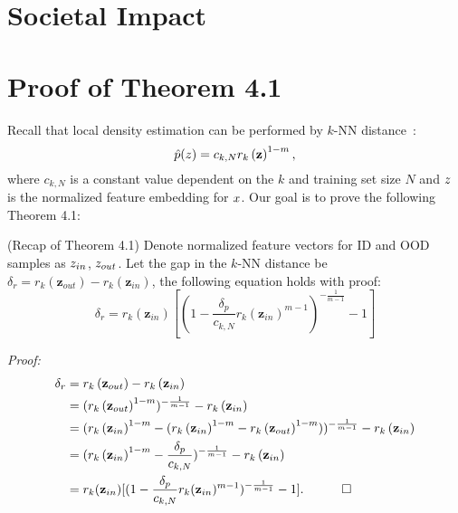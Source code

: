 
\appendix

\section{Societal Impact}

\section{Proof of Theorem 4.1}
\label{sec:proof_sup}
Recall that  local density estimation can be performed by $k$-NN distance~\cite{sun2022knn}: 
\begin{equation*}
\label{eq:estimate}
    \hat{p}(\*z) = c_{k, N} r_k\left(\mathbf{z}\right)^{1-m},
\end{equation*} where $c_{k, N}$ is a constant value dependent on the $k$ and training set size $N$ and $\*z$ is the normalized feature embedding for $\*x$. Our goal is to prove the following Theorem 4.1:

\begin{theorem} (Recap of Theorem 4.1) 
    Denote normalized feature vectors for ID and OOD samples as $\*z_{in}$, $\*z_{out}$. 
     Let the gap in the $k$-NN distance be $\delta_r = r_k\left(\mathbf{z}_{out}\right) -r_k\left(\mathbf{z}_{in}\right)$, the following equation holds with proof: 
     \begin{equation*}
         \delta_r = r_k(\mathbf{z}_{in}) [(1 - \frac{\delta_p}{c_{k, N}} r_k(\mathbf{z}_{in})^{m-1})^{-\frac{1}{m-1}} - 1]
     \end{equation*}
\end{theorem}

\textit{Proof:}
\begin{align*}
\small
\delta_r &= r_k\left(\mathbf{z}_{out}\right) -r_k\left(\mathbf{z}_{in}\right) \\
&= (r_k\left(\mathbf{z}_{out}\right)^{1-m})^{-\frac{1}{m-1}} -r_k\left(\mathbf{z}_{in}\right) \\
    &= (r_k\left(\mathbf{z}_{in}\right)^{1-m} - (r_k\left(\mathbf{z}_{in}\right)^{1-m} - r_k\left(\mathbf{z}_{out}\right)^{1-m}))^{-\frac{1}{m-1}}  -r_k\left(\mathbf{z}_{in}\right) \\
    &= (r_k\left(\mathbf{z}_{in}\right)^{1-m} - \frac{\delta_p}{c_{k, N}} )^{-\frac{1}{m-1}}  -r_k\left(\mathbf{z}_{in}\right) \\
    &= r_k(\mathbf{z}_{in}) [(1 - \frac{\delta_p}{c_{k, N}} r_k(\mathbf{z}_{in})^{m-1})^{-\frac{1}{m-1}} - 1].  \quad \quad \quad \square
\end{align*}




